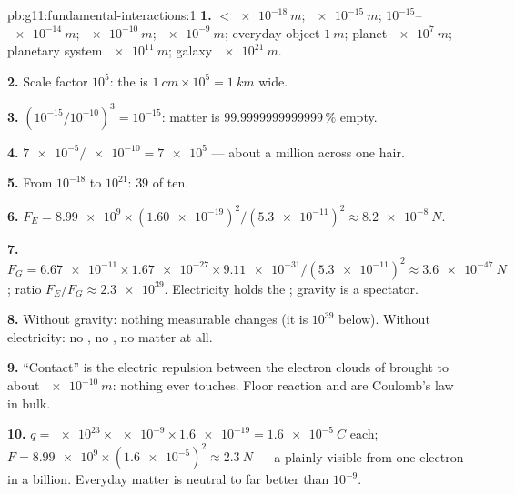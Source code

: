 \begin{solution}{pb:g11:fundamental-interactions:1}
\textbf{1.}  $< \qty{e-18}{m}$;  $\qty{e-15}{m}$; 
$10^{-15}$--$\qty{e-14}{m}$;  $\qty{e-10}{m}$; 
$\qty{e-9}{m}$; everyday object $\qty{1}{m}$; planet $\qty{e7}{m}$;
planetary system $\qty{e11}{m}$; galaxy $\qty{e21}{m}$.

\textbf{2.} Scale factor $10^{5}$: the  is
$\qty{1}{cm} \times 10^{5} = \qty{1}{km}$ wide.

\textbf{3.} $(10^{-15}/10^{-10})^3 = 10^{-15}$: matter is
$\num{99.9999999999999}\,\%$ empty.

\textbf{4.} $\num{7e-5}/\num{e-10} = \num{7e5}$  --- about a
million across one hair.

\textbf{5.} From $10^{-18}$ to $10^{21}$: $39$  of ten.

\textbf{6.} $F_E = \num{8.99e9} \times (\num{1.60e-19})^2 /
(\num{5.3e-11})^2 \approx \qty{8.2e-8}{N}$.

\textbf{7.} $F_G = \num{6.67e-11} \times \num{1.67e-27} \times
\num{9.11e-31}/(\num{5.3e-11})^2 \approx \qty{3.6e-47}{N}$; ratio
$F_E/F_G \approx \num{2.3e39}$. Electricity holds the ; gravity is
a spectator.

\textbf{8.} Without gravity: nothing measurable changes (it is $10^{39}$
below). Without electricity: no , no , no matter at all.

\textbf{9.} ``Contact'' is the electric repulsion between the electron
clouds of  brought to about $\qty{e-10}{m}$: nothing ever touches.
Floor reaction and  are Coulomb's law in bulk.

\textbf{10.} $q = \num{e23} \times \num{e-9} \times \num{1.6e-19} =
\qty{1.6e-5}{C}$ each;
$F = \num{8.99e9} \times (\num{1.6e-5})^2 \approx \qty{2.3}{N}$ --- a
plainly visible  from one electron in a billion. Everyday matter
is neutral to far better than $10^{-9}$.


\end{solution}

